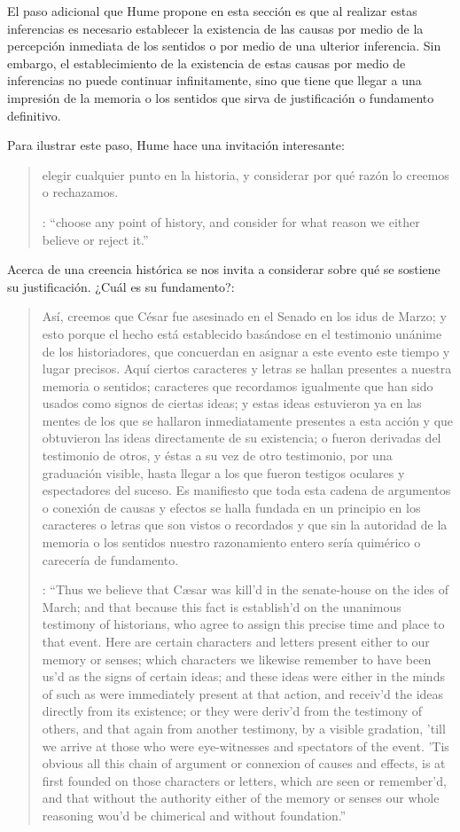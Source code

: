 El paso adicional que Hume propone en esta sección es que al realizar estas inferencias es necesario establecer la existencia de las causas por medio de la percepción inmediata de los sentidos o por medio de una ulterior inferencia. Sin embargo, el establecimiento de la existencia de estas causas por medio de inferencias no puede continuar infinitamente, sino que tiene que llegar a una impresión de la memoria o los sentidos que sirva de justificación o fundamento definitivo.

Para ilustrar este paso, Hume hace una invitación interesante: \blockquote[{\cite[58]{hume1740treatise}}: \enquote{choose any point of history, and consider for what reason we either believe or reject it.}]{elegir cualquier punto en la historia, y considerar por qué razón lo creemos o rechazamos.} Acerca de una creencia histórica se nos invita a considerar sobre qué se sostiene su justificación. ¿Cuál es su fundamento?: \blockquote[{\cite[58--59]{hume1740treatise}}: \enquote{Thus we believe that Cæsar was kill’d in the senate-house on the ides of March; and that because this fact is establish’d on the unanimous testimony of historians, who agree to assign this precise time and place to that event. Here are certain characters and letters present either to our memory or senses; which characters we likewise remember to have been us’d as the signs of certain ideas; and these ideas were either in the minds of such as were immediately present at that action, and receiv’d the ideas directly from its existence; or they were deriv’d from the testimony of others, and that again from another testimony, by a visible gradation, ’till we arrive at those who were eye-witnesses and spectators of the event. ’Tis obvious all this chain of argument or connexion of causes and effects, is at first founded on those characters or letters, which are seen or remember’d, and that without the authority either of the memory or senses our whole reasoning wou’d be chimerical and without foundation.}]{Así, creemos que César fue asesinado en el Senado en los idus de Marzo; y esto porque el hecho está establecido basándose en el testimonio unánime de los historiadores, que concuerdan en asignar a este evento este tiempo y lugar precisos. Aquí ciertos caracteres y letras se hallan presentes a nuestra memoria o sentidos; caracteres que recordamos igualmente que han sido usados como signos de ciertas ideas; y estas ideas estuvieron ya en las mentes de los que se hallaron inmediatamente presentes a esta acción y que obtuvieron las ideas directamente de su existencia; o fueron derivadas del testimonio de otros, y éstas a su vez de otro testimonio, por una graduación visible, hasta llegar a los que fueron testigos oculares y espectadores del suceso. Es manifiesto que toda esta cadena de argumentos o conexión de causas y efectos se halla fundada en un principio en los caracteres o letras que son vistos o recordados y que sin la autoridad de la memoria o los sentidos nuestro razonamiento entero sería quimérico o carecería de fundamento.}

